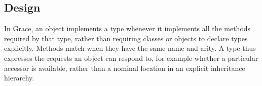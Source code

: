 






\subsection{Design}





%


In Grace\citep{graceOnward12},
an object implements a type whenever it
implements all the methods required by that type,
rather than requiring classes or objects to declare types explicitly.
Methods match when they have the same name and arity.
A type thus expresses the requests an object can respond to,
for example whether a particular accessor is available,
rather than a nominal location in an explicit inheritance hierarchy.

